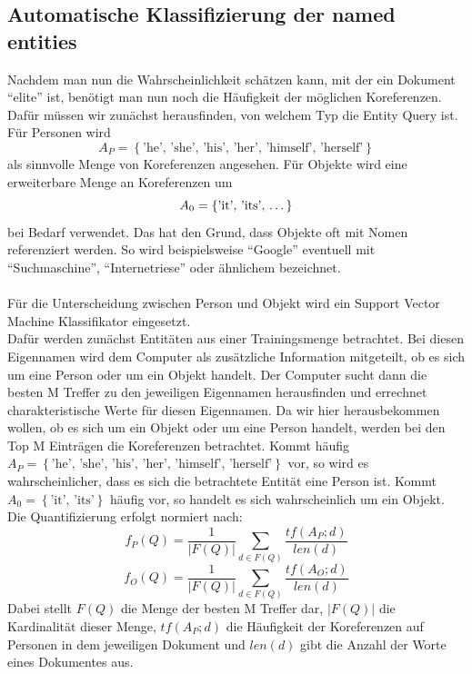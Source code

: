 \subsection{Automatische Klassifizierung der named entities}
Nachdem man nun die Wahrscheinlichkeit schätzen kann, mit der ein Dokument ``elite'' ist, benötigt man nun noch die Häufigkeit der möglichen Koreferenzen.\\
Dafür müssen wir zunächst herausfinden, von welchem Typ die Entity Query ist. Für Personen wird
\[A_P=\left\{ \text{'he', 'she', 'his', 'her', 'himself', 'herself'} \right\}\]
als sinnvolle Menge von Koreferenzen angesehen. Für Objekte wird eine erweiterbare Menge an Koreferenzen um
\[A_0=\left\{ \text{'it', 'its', \dots} \right\}\]
bei Bedarf verwendet. Das hat den Grund, dass Objekte oft mit Nomen referenziert werden. So wird beispielsweise ``Google'' eventuell mit ``Suchmaschine'', ``Internetriese'' oder ähnlichem bezeichnet.\\
\\
Für die Unterscheidung zwischen Person und Objekt wird ein Support Vector Machine Klassifikator eingesetzt.\\
Dafür werden zunächst Entitäten aus einer Trainingsmenge betrachtet. Bei diesen Eigennamen wird dem Computer als zusätzliche Information mitgeteilt, ob es sich um eine Person oder um ein Objekt handelt. Der Computer sucht dann die besten M Treffer zu den jeweiligen Eigennamen herausfinden und errechnet charakteristische Werte für diesen Eigennamen. Da wir hier herausbekommen wollen, ob es sich um ein Objekt oder um eine Person handelt, werden bei den Top M Einträgen die Koreferenzen betrachtet. Kommt häufig $A_P=\left\{ \text{'he', 'she', 'his', 'her', 'himself', 'herself'} \right\}$ vor, so wird es wahrscheinlicher, dass es sich die betrachtete Entität eine Person ist. Kommt $A_0=\left\{ \text{'it', 'its'} \right\}$ häufig vor, so handelt es sich wahrscheinlich um ein Objekt. Die Quantifizierung erfolgt normiert nach:
\[f_P\left( Q \right)=\frac{1}{|F\left( Q \right)|}\sum_{d\in F\left( Q \right)} \frac{tf\left( A_P;d \right)}{len \left( d \right)}\]
\[f_O\left( Q \right)=\frac{1}{|F\left( Q \right)|}\sum_{d\in F\left( Q \right)} \frac{tf\left( A_O;d \right)}{len \left( d \right)}\]
Dabei stellt $F\left( Q \right)$ die Menge der besten M Treffer dar, $|F\left( Q \right)|$ die Kardinalität dieser Menge, $tf\left( A_P;d \right)$ die Häufigkeit der Koreferenzen auf Personen in dem jeweiligen Dokument und $len\left( d \right)$ gibt die Anzahl der Worte eines Dokumentes aus.\\
